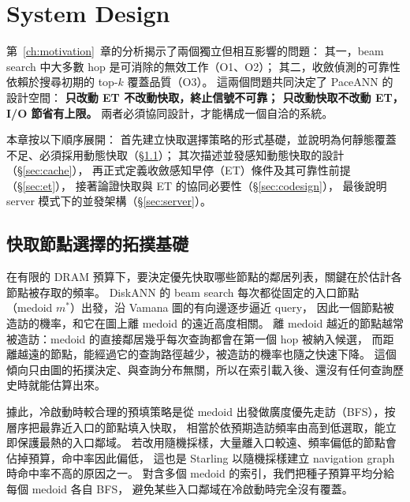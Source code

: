 \chapter{System Design}
\label{ch:arch}

第~\ref{ch:motivation}~章的分析揭示了兩個獨立但相互影響的問題：
其一，beam search 中大多數 hop 是可消除的無效工作（O1、O2）；
其二，收斂偵測的可靠性依賴於搜尋初期的 top-$k$ 覆蓋品質（O3）。
這兩個問題共同決定了 PaceANN 的設計空間：
\textbf{只改動 ET 不改動快取，終止信號不可靠；
只改動快取不改動 ET，I/O 節省有上限。}
兩者必須協同設計，才能構成一個自洽的系統。

本章按以下順序展開：
首先建立快取選擇策略的形式基礎，並說明為何靜態覆蓋不足、必須採用動態快取（§\ref{sec:topology}）；
其次描述並發感知動態快取的設計（§\ref{sec:cache}），
再正式定義收斂感知早停（ET）條件及其可靠性前提（§\ref{sec:et}），
接著論證快取與 ET 的協同必要性（§\ref{sec:codesign}），
最後說明 server 模式下的並發架構（§\ref{sec:server}）。

\section{快取節點選擇的拓撲基礎}
\label{sec:topology}

在有限的 DRAM 預算下，要決定優先快取哪些節點的鄰居列表，關鍵在於估計各節點被存取的頻率。
DiskANN 的 beam search 每次都從固定的入口節點（medoid $m^*$）出發，沿 Vamana 圖的有向邊逐步逼近 query，
因此一個節點被造訪的機率，和它在圖上離 medoid 的遠近高度相關。
離 medoid 越近的節點越常被造訪：medoid 的直接鄰居幾乎每次查詢都會在第一個 hop 被納入候選，
而距離越遠的節點，能經過它的查詢路徑越少，被造訪的機率也隨之快速下降。
這個傾向只由圖的拓撲決定、與查詢分布無關，所以在索引載入後、還沒有任何查詢歷史時就能估算出來。

據此，冷啟動時較合理的預填策略是從 medoid 出發做廣度優先走訪（BFS），按層序把最靠近入口的節點填入快取，
相當於依預期造訪頻率由高到低選取，能立即保護最熱的入口鄰域。
若改用隨機採樣，大量離入口較遠、頻率偏低的節點會佔掉預算，命中率因此偏低，
這也是 Starling 以隨機採樣建立 navigation graph 時命中率不高的原因之一。
對含多個 medoid 的索引，我們把種子預算平均分給每個 medoid 各自 BFS，
避免某些入口鄰域在冷啟動時完全沒有覆蓋。

